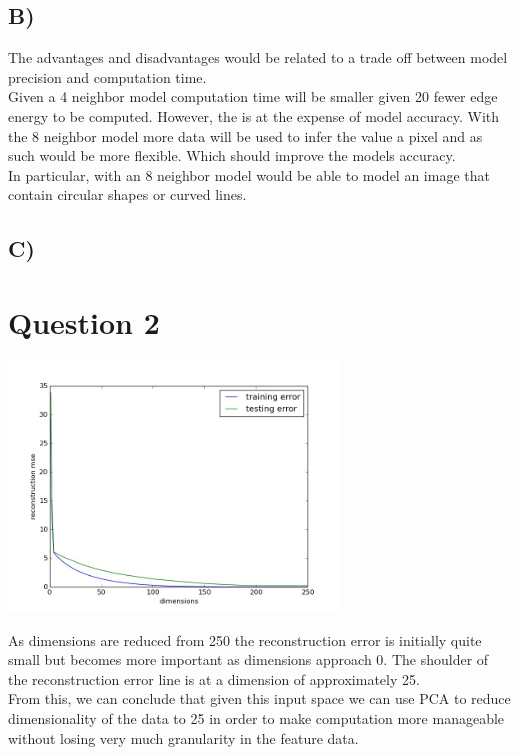 \documentclass{report}
\begin{document}
\subsection*{B)}
The advantages and disadvantages would be related to a trade off between
model precision and computation time.\\

Given a 4 neighbor model computation time will be smaller given 20 fewer edge
energy to be computed. However, the is at the expense of model accuracy. With
the 8 neighbor model more data will be used to infer the value a pixel and
as such would be more flexible. Which should improve the models accuracy.\\

In particular, with an 8 neighbor model would be able to model an image that contain
circular shapes or curved lines.
\subsection*{C)}

\section*{Question 2}
\begin{center}
\includegraphics[width=250pt, keepaspectratio=true]{reconstruction_error.jpg}\\
\end{center}
As dimensions are reduced from 250 the reconstruction error is initially quite
small but becomes more important as dimensions approach 0. The
shoulder of the reconstruction error line is at a dimension of approximately 25.\\

From this, we can conclude that given this input space we can use PCA to
reduce dimensionality of the data to 25 in order to make computation more manageable
without losing very much granularity in the feature data.
\end{document}
